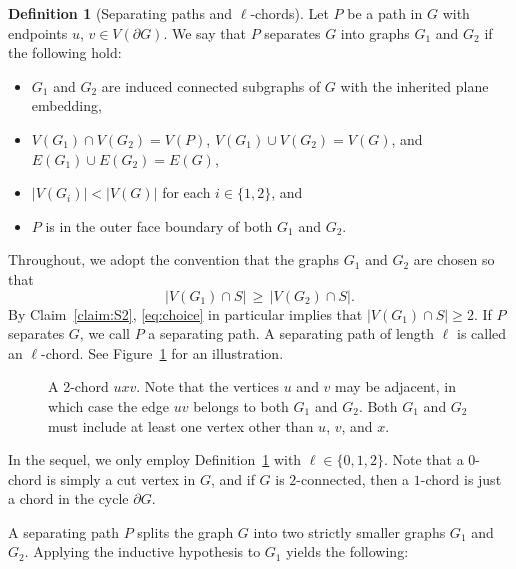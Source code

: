 \documentclass[11pt]{article}
\theoremstyle{slantthm}
\numberwithin{equation}{section}
\theoremstyle{definition}
\newtheorem{definition}[thm]{Definition}
\renewcommand{\geq}{\geqslant}
\numberwithin{equation}{section}
\newcommand{\0}{\varnothing}
\newcommand{\set}[1]{\{#1\}}
\newcommand{\emphd}[1]{{\fontseries{b}\selectfont\textsf{#1}}}
\newcommand{\bdry}[1]{{\partial #1}}
\begin{document}
\begin{definition}[Separating paths and $\ell$-chords]\label{seppathdef}
    Let $P$ be a path in $G$ with endpoints $u$, $v \in V(\bdry{G})$. We say that \emphd{$P$ separates $G$ into graphs $G_1$ and $G_2$} if the following hold:
\begin{itemize}
    \item $G_1$ and $G_2$ are induced connected subgraphs of $G$ with the inherited plane embedding,
    \item $V(G_1) \cap V(G_2) = V(P)$, $V(G_1) \cup V(G_2) = V(G)$,  and $E(G_1) \cup E(G_2) = E(G)$,
    \item $|V(G_i)| < |V(G)|$ for each $i \in \set{1,2}$, and
    \item $P$ is in the outer face boundary of both $G_1$ and $G_2$. %
\end{itemize}
Throughout, we adopt the convention that the graphs $G_1$ and $G_2$ are chosen so that \begin{equation}\label{eq:choice}
    |V(G_1) \cap S| \,\geq\, |V(G_2) \cap S|.
\end{equation}
By Claim~\ref{claim:S2}, \eqref{eq:choice} in particular implies that $|V(G_1) \cap S| \geq 2$. If $P$ separates $G$, we call $P$ a \emphd{separating path}. A separating path of length $\ell$ is called an \emphd{$\ell$-chord}. %
See Figure~\ref{fig:2chord} for an illustration.
\end{definition}
\begin{figure}[t]
    \centering
       
       \caption{A 2-chord $uxv$. Note that the vertices $u$ and $v$ may be adjacent, in which case the edge $uv$ belongs to both $G_1$ and $G_2$. Both $G_1$ and $G_2$ must include at least one vertex other than $u$, $v$, and $x$.}\label{fig:2chord}
\end{figure}

    In the sequel, we only employ Definition~\ref{seppathdef} with $\ell \in \set{0,1,2}$. Note that a $0$-chord is simply a cut vertex in $G$, and if $G$ is $2$-connected, then a $1$-chord is just a chord in the cycle $\bdry{G}$.

    A separating path $P$ splits the graph $G$ into two strictly smaller graphs $G_1$ and $G_2 $. Applying the inductive hypothesis to $G_1$ yields the following: %
\end{document}

